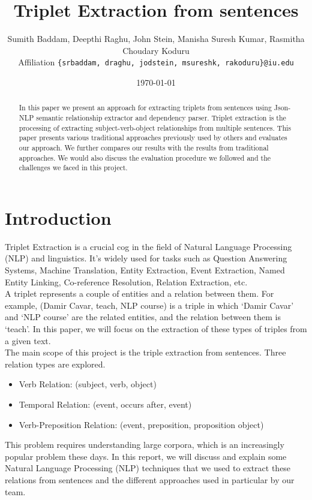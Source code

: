 \documentclass[11pt,letterpaper]{article}
\title{Triplet Extraction from sentences}
\author{Sumith Baddam, Deepthi Raghu, John Stein, Manisha Suresh Kumar, Rasmitha Choudary Koduru \\
  Affiliation
  {\tt \{srbaddam, draghu, jodstein, msureshk, rakoduru\}@iu.edu} \\}
\date{\today}
\begin{document}
\maketitle

\begin{abstract}
  In this paper we present an approach for extracting triplets from sentences using Json-NLP semantic relationship extractor and dependency parser. Triplet extraction is the processing of extracting subject-verb-object relationships from multiple sentences. This paper presents various traditional approaches previously used by others and evaluates our approach. We further compares our results with the results from traditional approaches. We would also discuss the evaluation procedure we followed and the challenges we faced in this project.
\end{abstract}

\section{Introduction}

Triplet Extraction is a crucial cog in the field of Natural Language Processing (NLP) and linguistics. It’s widely used for tasks such as Question Answering Systems, Machine Translation, Entity Extraction, Event Extraction, Named Entity Linking, Co-reference Resolution, Relation Extraction, etc.\\

A triplet represents a couple of entities and a relation between them. For example, (Damir Cavar, teach, NLP course) is a triple in which ‘Damir Cavar’ and ‘NLP course’ are the related entities, and the relation between them is ‘teach’. In this paper, we will focus on the extraction of these types of triples from a given text.\\

The main scope of this project is the triple extraction from sentences. Three relation types are explored.

\begin{itemize}
    \item Verb Relation: (subject, verb, object)
    \item Temporal Relation: (event, occurs after, event)
    \item Verb-Preposition Relation: (event, preposition, proposition object)
\end{itemize}

This problem requires understanding large corpora, which is an increasingly popular problem these days. In this report, we will discuss and explain some Natural Language Processing (NLP) techniques that we used to extract these relations from sentences and the different approaches used in particular by our team.
\end{document}
